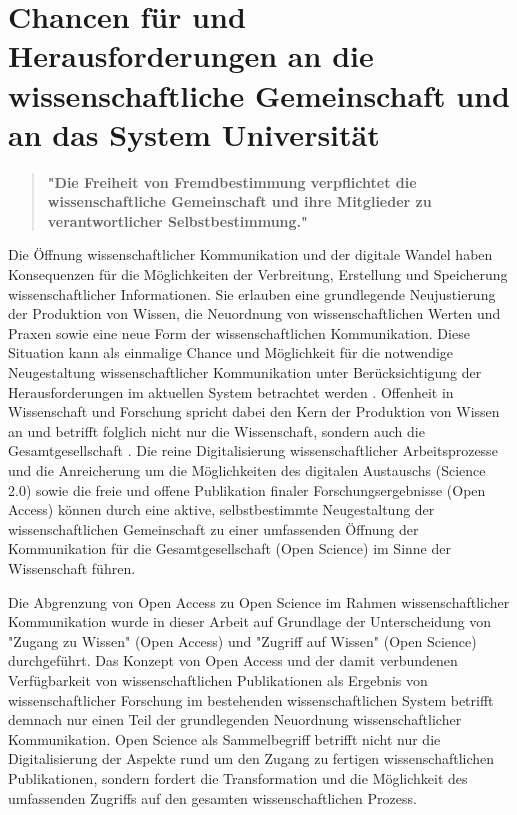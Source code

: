 \section{Chancen für und Herausforderungen an die wissenschaftliche Gemeinschaft und an das System Universität}

\begin{quote}
\textbf{"Die Freiheit von Fremdbestimmung verpflichtet die wissenschaftliche Gemeinschaft und ihre Mitglieder zu verantwortlicher Selbstbestimmung."}
\end{quote} \cite{Oezmen_2015}

Die Öffnung wissenschaftlicher Kommunikation und der digitale Wandel haben Konsequenzen für die Möglichkeiten der Verbreitung, Erstellung und Speicherung wissenschaftlicher Informationen. Sie erlauben eine grundlegende Neujustierung der Produktion von Wissen, die Neuordnung von wissenschaftlichen Werten und Praxen sowie eine neue Form der wissenschaftlichen Kommunikation. Diese Situation kann als einmalige Chance und Möglichkeit für die notwendige Neugestaltung wissenschaftlicher Kommunikation unter Berücksichtigung der Herausforderungen im aktuellen System betrachtet werden \cite{naeder_2010_open}. Offenheit in Wissenschaft und Forschung spricht dabei den Kern der Produktion von Wissen an und betrifft folglich nicht nur die Wissenschaft, sondern auch die Gesamtgesellschaft \cite{Mussell_2013}. Die reine Digitalisierung wissenschaftlicher Arbeitsprozesse und die Anreicherung um die Möglichkeiten des digitalen Austauschs (Science 2.0) sowie die freie und offene Publikation finaler Forschungsergebnisse (Open Access) können durch eine aktive, selbstbestimmte Neugestaltung der wissenschaftlichen Gemeinschaft zu einer umfassenden Öffnung der Kommunikation für die Gesamtgesellschaft (Open Science) im Sinne der Wissenschaft führen.

Die Abgrenzung von Open Access zu Open Science im Rahmen wissenschaftlicher Kommunikation wurde in dieser Arbeit auf Grundlage der Unterscheidung von "Zugang zu Wissen" (Open Access) und "Zugriff auf Wissen" (Open Science) durchgeführt. Das Konzept von Open Access und der damit verbundenen Verfügbarkeit von wissenschaftlichen Publikationen als Ergebnis von wissenschaftlicher Forschung im bestehenden wissenschaftlichen System betrifft demnach nur einen Teil der grundlegenden Neuordnung wissenschaftlicher Kommunikation. Open Science als Sammelbegriff betrifft nicht nur die Digitalisierung der Aspekte rund um den Zugang zu fertigen wissenschaftlichen Publikationen, sondern fordert die Transformation und die Möglichkeit des umfassenden Zugriffs auf den gesamten wissenschaftlichen Prozess.

